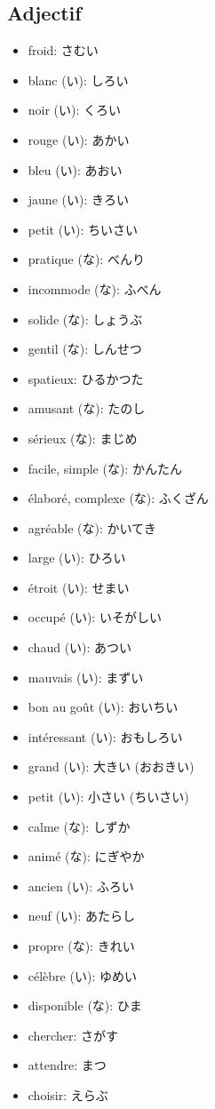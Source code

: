 \documentclass{article}
\begin{document}
\begin{CJK}{UTF8}{min}
    \subsection{Adjectif}
    \begin{itemize}
        \item froid: さむい
        \item blanc (い): しろい
        \item noir (い): くろい
        \item rouge (い): あかい
        \item bleu (い): あおい
        \item jaune (い): きろい
        \item petit (い): ちいさい
        \item pratique (な): べんり
        \item incommode (な): ふべん
        \item solide (な): しょうぶ
        \item gentil (な): しんせつ
        \item spatieux: ひるかつた
        \item amusant (な): たのし
        \item sérieux (な): まじめ
        \item facile, simple (な): かんたん
        \item élaboré, complexe (な): ふくざん
        \item agréable (な): かいてき
        \item large (い): ひろい
        \item étroit (い): せまい
        \item occupé (い): いそがしい
        \item chaud (い): あつい
        \item mauvais (い): まずい
        \item bon au goût (い): おいちい
        \item intéressant (い): おもしろい
        \item grand (い): 大きい (おおきい)
        \item petit (い): 小さい (ちいさい)
        \item calme (な): しずか
        \item animé (な): にぎやか
        \item ancien (い): ふろい
        \item neuf (い): あたらし
        \item propre (な): きれい
        \item célèbre (い): ゆめい
        \item disponible (な): ひま
        \item chercher: さがす
        \item attendre: まつ
        \item choisir: えらぶ
    \end{itemize}

\end{CJK}
\end{document}
